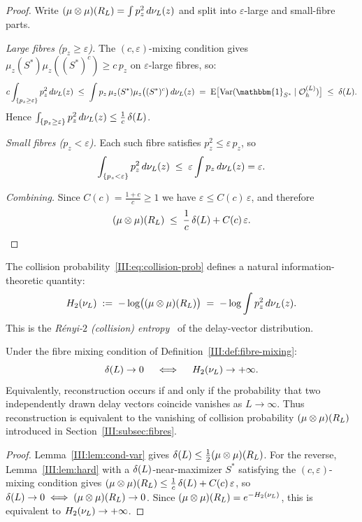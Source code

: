 \begin{proof}
Write $(\mu\otimes\mu)(R_L) = \int p_z^2\,d\nu_L(z)$ and split into
$\varepsilon$-large and small-fibre parts.

\emph{Large fibres ($p_z \geq \varepsilon$).}
The $(c,\varepsilon)$-mixing condition gives
$\mu_z(S^*)\mu_z((S^*)^c) \geq c\,p_z$ on $\varepsilon$-large fibres, so:
\[
  c\int_{\{p_z \geq \varepsilon\}} p_z^2\,d\nuL(z)
  \;\leq\; \int p_z\,\mu_z(S^*)\mu_z\bigl((S^*)^c\bigr)\,d\nuL(z)
  \;=\; \mathrm{E}\bigl[\mathrm{Var}(\mathbbm{1}_{S^*}\mid\OhL)\bigr]
  \;\leq\; \deltaL.
\]
Hence $\int_{\{p_z \geq \varepsilon\}} p_z^2\,d\nu_L(z) \leq \frac{1}{c}\,\delta(L)$.

\emph{Small fibres ($p_z < \varepsilon$).}
Each such fibre satisfies $p_z^2 \leq \varepsilon\,p_z$, so
\[
  \int_{\{p_z < \varepsilon\}} p_z^2\,d\nu_L(z)
  \;\leq\; \varepsilon\int p_z\,d\nu_L(z) = \varepsilon.
\]

\emph{Combining.}
Since $C(c) = \frac{1+c}{c} \geq 1$ we have $\varepsilon \leq C(c)\,\varepsilon$,
and therefore
\[
  (\mu\otimes\mu)(R_L) \;\leq\; \frac{1}{c}\,\delta(L) + C(c)\,\varepsilon. \qedhere
\]
\end{proof}

The collision probability~\eqref{III:eq:collision-prob} defines a natural
information-theoretic quantity:
\begin{equation}
  H_2(\nu_L) \;:=\; -\log\bigl((\mu \otimes \mu)(R_L)\bigr)
  \;=\; -\log \int p_z^2\,d\nu_L(z).
  \label{III:eq:entropy}
\end{equation}
This is the \emph{Rényi-$2$ (collision) entropy}~\cite{Renyi1961} of the delay-vector distribution.

\begin{corollary}
\label{III:cor:entropy}
Under the fibre mixing condition of Definition~\ref{III:def:fibre-mixing}:
\[
  \delta(L) \to 0
  \quad\iff\quad
  H_2(\nu_L) \to +\infty.
\]
Equivalently, reconstruction occurs if and only if the probability that two
independently drawn delay vectors coincide vanishes as $L \to \infty$.
Thus reconstruction is equivalent to the vanishing of collision probability
$(\mu \otimes \mu)(R_L)$ introduced in Section~\ref{III:subsec:fibres}.
\end{corollary}

\begin{proof}
Lemma~\ref{III:lem:cond-var} gives $\delta(L) \leq \tfrac{1}{2}(\mu\otimes\mu)(R_L)$.
For the reverse, Lemma~\ref{III:lem:hard} with a $\delta(L)$-near-maximizer $S^*$
satisfying the $(c,\varepsilon)$-mixing condition gives
$(\mu\otimes\mu)(R_L) \leq \frac{1}{c}\,\delta(L) + C(c)\,\varepsilon$,
so $\delta(L) \to 0 \iff (\mu\otimes\mu)(R_L) \to 0$.
Since $(\mu\otimes\mu)(R_L) = e^{-H_2(\nu_L)}$, this is equivalent to
$H_2(\nu_L) \to +\infty$.
\end{proof}

